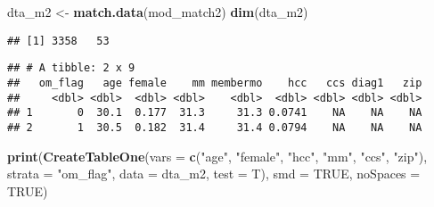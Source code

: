 \documentclass[]{article}
\newenvironment{Shaded}{\begin{snugshade}}{\end{snugshade}}
\newcommand{\KeywordTok}[1]{\textcolor[rgb]{0.13,0.29,0.53}{\textbf{#1}}}
\newcommand{\DataTypeTok}[1]{\textcolor[rgb]{0.13,0.29,0.53}{#1}}
\newcommand{\StringTok}[1]{\textcolor[rgb]{0.31,0.60,0.02}{#1}}
\newcommand{\OtherTok}[1]{\textcolor[rgb]{0.56,0.35,0.01}{#1}}
\newcommand{\OperatorTok}[1]{\textcolor[rgb]{0.81,0.36,0.00}{\textbf{#1}}}
\newcommand{\NormalTok}[1]{#1}
\begin{document}
\begin{Shaded}
\begin{Highlighting}[]
\NormalTok{dta_m2 <-}\StringTok{ }\KeywordTok{match.data}\NormalTok{(mod_match2)}
\KeywordTok{dim}\NormalTok{(dta_m2)}
\end{Highlighting}
\end{Shaded}

\begin{verbatim}
## [1] 3358   53
\end{verbatim}

\begin{Shaded}
\end{Shaded}

\begin{verbatim}
## # A tibble: 2 x 9
##   om_flag   age female    mm membermo    hcc   ccs diag1   zip
##     <dbl> <dbl>  <dbl> <dbl>    <dbl>  <dbl> <dbl> <dbl> <dbl>
## 1       0  30.1  0.177  31.3     31.3 0.0741    NA    NA    NA
## 2       1  30.5  0.182  31.4     31.4 0.0794    NA    NA    NA
\end{verbatim}

\begin{Shaded}
\begin{Highlighting}[]
\KeywordTok{print}\NormalTok{(}\KeywordTok{CreateTableOne}\NormalTok{(}\DataTypeTok{vars =} \KeywordTok{c}\NormalTok{(}\StringTok{"age"}\NormalTok{, }\StringTok{"female"}\NormalTok{, }\StringTok{"hcc"}\NormalTok{, }\StringTok{"mm"}\NormalTok{, }\StringTok{"ccs"}\NormalTok{, }\StringTok{"zip"}\NormalTok{), }\DataTypeTok{strata =} \StringTok{"om_flag"}\NormalTok{, }\DataTypeTok{data =}\NormalTok{ dta_m2, }\DataTypeTok{test =}\NormalTok{ T), }\DataTypeTok{smd =} \OtherTok{TRUE}\NormalTok{, }\DataTypeTok{noSpaces =} \OtherTok{TRUE}\NormalTok{)}
\end{Highlighting}
\end{Shaded}
\end{document}
